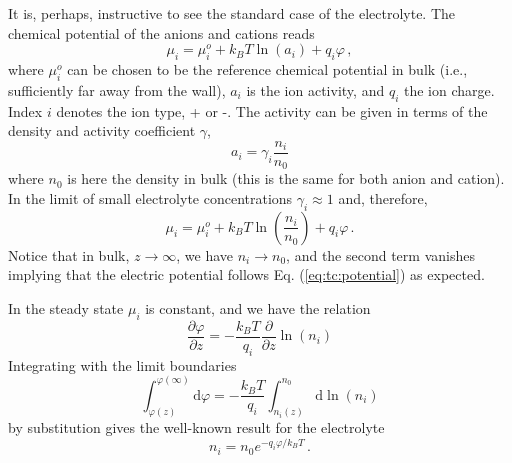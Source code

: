 \documentclass[11pt]{article}
\renewcommand{\d}{\mathrm{d}}
\begin{document}
It is, perhaps, instructive to see the standard case of the electrolyte. The chemical potential of 
the anions and cations reads
\begin{equation}
	\mu_i = \mu_i^o + k_BT\ln(a_i) + q_i\varphi \, ,
\end{equation}
where $\mu_i^o$ can be chosen to be the reference chemical potential in bulk (i.e., sufficiently 
far away from the wall), $a_i$ is the ion activity, and $q_i$ the ion         
charge. Index $i$ denotes the ion type, + or -. The activity can be given in terms of the 
density and activity coefficient $\gamma$, 
\begin{equation}
\label{eq:tc:activity0}
a_i = \gamma_i \frac{n_i}{n_0} 
\end{equation}
where $n_0$ is here the density in bulk (this is the same for both anion and cation). In the limit 
of small electrolyte concentrations $\gamma_i \approx 1$ and, therefore,
\begin{equation}
	\mu_i = \mu_i^o + k_BT\ln\left(\frac{n_i}{n_0}\right) + q_i\varphi \, .
\end{equation}
Notice that in bulk, $z \rightarrow \infty$, we have $n_i \rightarrow n_0$, and the second term 
vanishes implying that the electric potential follows Eq. (\ref{eq:tc:potential}) as expected. 

In the steady state $\mu_i$ is constant, and we have the relation 
\begin{equation}
	\frac{\partial \varphi}{\partial z} = -\frac{k_BT}{q_i}\frac{\partial}{\partial z} \ln (n_i)
\end{equation}
Integrating with the limit boundaries 
\begin{equation}
	\int_{\varphi(z)}^{\varphi(\infty)} \d \varphi = -\frac{k_BT}{q_i} \int_{n_i(z)}^{n_0} \d 
\ln(n_i)
\end{equation}
by substitution gives the well-known result for the electrolyte 
\begin{equation}
	n_i = n_0e^{-q_i\varphi/k_BT} \, .
\end{equation}
\end{document}
